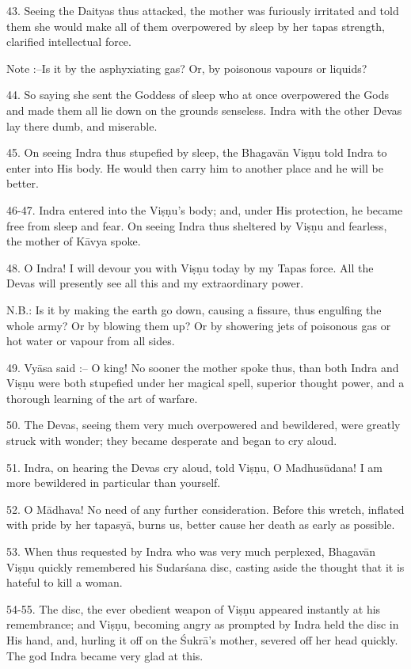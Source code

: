 43. Seeing the Daityas thus attacked, the mother was furiously irritated and told them she would make all of them overpowered by sleep by her tapas strength, clarified intellectual force.

Note :--Is it by the asphyxiating gas? Or, by poisonous vapours or liquids?

44. So saying she sent the Goddess of sleep who at once overpowered the Gods and made them all lie down on the grounds senseless. Indra with the other Devas lay there dumb, and miserable.

45. On seeing Indra thus stupefied by sleep, the Bhagav\=an Vi\d{s}\d{n}u told Indra to enter into His body. He would then carry him to another place and he will be better.

46-47. Indra entered into the Vi\d{s}\d{n}u's body; and, under His protection, he became free from sleep and fear. On seeing Indra thus sheltered by Vi\d{s}\d{n}u and fearless, the mother of K\=avya spoke.

48. O Indra! I will devour you with Vi\d{s}\d{n}u today by my Tapas force. All the Devas will presently see all this and my extraordinary power.

N.B.: Is it by making the earth go down, causing a fissure, thus engulfing the whole army? Or by blowing them up? Or by showering jets of poisonous gas or hot water or vapour from all sides.

49. Vy\=asa said :-- O king! No sooner the mother spoke thus, than both Indra and Vi\d{s}\d{n}u were both stupefied under her magical spell, superior thought power, and a thorough learning of the art of warfare.

50. The Devas, seeing them very much overpowered and bewildered, were greatly struck with wonder; they became desperate and began to cry aloud.

51. Indra, on hearing the Devas cry aloud, told Vi\d{s}\d{n}u, O Madhus\=udana! I am more bewildered in particular than yourself.

52. O M\=adhava! No need of any further consideration. Before this wretch, inflated with pride by her tapasy\=a, burns us, better cause her death as early as possible.

53. When thus requested by Indra who was very much perplexed, Bhagav\=an Vi\d{s}\d{n}u quickly remembered his Sudar\'sana disc, casting aside the thought that it is hateful to kill a woman.

54-55. The disc, the ever obedient weapon of Vi\d{s}\d{n}u appeared instantly at his remembrance; and Vi\d{s}\d{n}u, becoming angry as prompted by Indra held the disc in His hand, and, hurling it off on the \'Sukr\=a's mother, severed off her head quickly. The god Indra became very glad at this.

